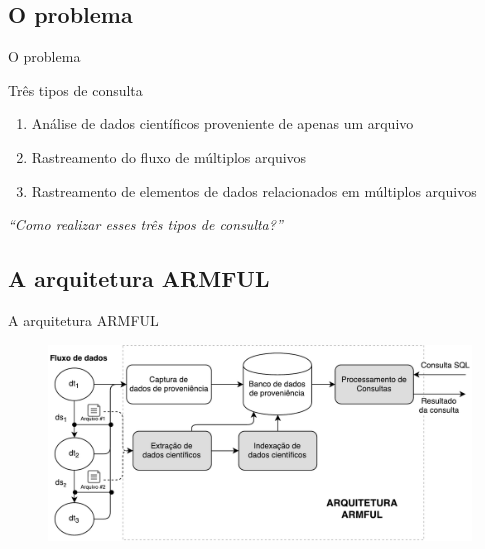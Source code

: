 \documentclass[12pt,compress,final]{beamer}
\begin{document}
\subsection*{O problema}

\begin{frame}[t]{O problema}
    \begin{exampleblock}{Três tipos de consulta}
    \begin{enumerate}
        \item Análise de \alert{dados científicos} proveniente de apenas um arquivo %
        \item Rastreamento do \alert{fluxo de múltiplos arquivos}
        \item Rastreamento de \alert{elementos de dados relacionados} em múltiplos arquivos
    \end{enumerate}
    \end{exampleblock}
    \vfill
    \centerline{\textit{\large ``Como realizar esses três tipos de consulta?''}}
    \vfill
\end{frame}


\subsection*{A arquitetura ARMFUL}

\begin{frame}[t]{A arquitetura ARMFUL}

\begin{figure}
\includegraphics[width=\textwidth]{img/armful-architecture-simplified.pdf}
\end{figure}

\end{frame}
\end{document}
